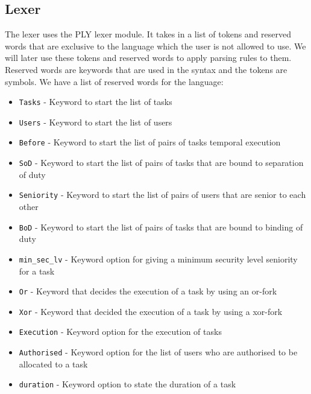 \documentclass[a4paper]{report}
\begin{document}
\subsection{Lexer}
The lexer uses the PLY lexer module. It takes in a list of tokens and reserved words that are exclusive to the language which the user is not allowed to use. We will later use these tokens and reserved words to apply parsing rules to them. Reserved words are keywords that are used in the syntax and the tokens are symbols.
We have a list of reserved words for the language:
\begin{itemize}
\item \texttt{Tasks} - Keyword to start the list of tasks
\item \texttt{Users} - Keyword to start the list of users
\item \texttt{Before} - Keyword to start the list of pairs of tasks temporal execution
\item \texttt{SoD} - Keyword to start the list of pairs of tasks that are bound to separation of duty
\item \texttt{Seniority} - Keyword to start the list of pairs of users that are senior to each other
\item \texttt{BoD} - Keyword to start the list of pairs of tasks that are bound to binding of duty
\item \texttt{min\_sec\_lv} - Keyword option for giving a minimum security level seniority for a task
\item \texttt{Or} - Keyword that decides the execution of a task by using an or-fork
\item \texttt{Xor} - Keyword that decided the execution of a task by using a xor-fork
\item \texttt{Execution} - Keyword option for the execution of tasks
\item \texttt{Authorised} - Keyword option for the list of users who are authorised to be allocated to a task
\item \texttt{duration} - Keyword option to state the duration of a task
\end{itemize}
\end{document}

